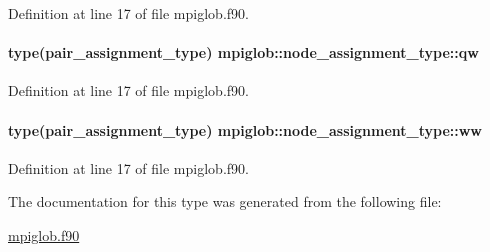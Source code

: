 Definition at line 17 of file mpiglob.\-f90.

\hypertarget{structmpiglob_1_1node__assignment__type_a469fd7da5a4020d0fd00f6cabd89cde6}{
\paragraph[{qw}]{\setlength{\rightskip}{0pt plus 5cm}type({\bf pair\-\_\-assignment\-\_\-type}) mpiglob\-::node\-\_\-assignment\-\_\-type\-::qw}}\label{structmpiglob_1_1node__assignment__type_a469fd7da5a4020d0fd00f6cabd89cde6}


Definition at line 17 of file mpiglob.\-f90.

\hypertarget{structmpiglob_1_1node__assignment__type_a2f23d0b3aaead9ad8650dbd809e52aaf}{
\paragraph[{ww}]{\setlength{\rightskip}{0pt plus 5cm}type({\bf pair\-\_\-assignment\-\_\-type}) mpiglob\-::node\-\_\-assignment\-\_\-type\-::ww}}\label{structmpiglob_1_1node__assignment__type_a2f23d0b3aaead9ad8650dbd809e52aaf}


Definition at line 17 of file mpiglob.\-f90.



The documentation for this type was generated from the following file\-:\begin{DoxyCompactItemize}
\item 
\hyperlink{mpiglob_8f90}{mpiglob.\-f90}\end{DoxyCompactItemize}
